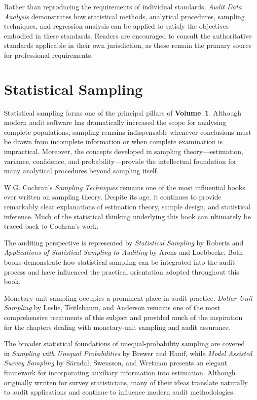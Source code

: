 Rather than reproducing the requirements of individual standards, \textit{Audit Data Analysis} demonstrates how statistical methods, analytical procedures, sampling techniques, and regression analysis can be applied to satisfy the objectives embodied in these standards. Readers are encouraged to consult the authoritative standards applicable in their own jurisdiction, as these remain the primary source for professional requirements.

\section*{Statistical Sampling}

Statistical sampling forms one of the principal pillars of \textbf{Volume~1}. Although modern audit software has dramatically increased the scope for analysing complete populations, sampling remains indispensable whenever conclusions must be drawn from incomplete information or when complete examination is impractical. Moreover, the concepts developed in sampling theory---estimation, variance, confidence, and probability---provide the intellectual foundation for many analytical procedures beyond sampling itself.

W.G. Cochran's \textit{Sampling Techniques} remains one of the most influential books ever written on sampling theory. Despite its age, it continues to provide remarkably clear explanations of estimation theory, sample design, and statistical inference. Much of the statistical thinking underlying this book can ultimately be traced back to Cochran's work.

The auditing perspective is represented by \textit{Statistical Sampling} by Roberts and \textit{Applications of Statistical Sampling to Auditing} by Arens and Loebbecke. Both books demonstrate how statistical sampling can be integrated into the audit process and have influenced the practical orientation adopted throughout this book.

Monetary-unit sampling occupies a prominent place in audit practice. \textit{Dollar Unit Sampling} by Leslie, Teitlebaum, and Anderson remains one of the most comprehensive treatments of this subject and provided much of the inspiration for the chapters dealing with monetary-unit sampling and audit assurance.

The broader statistical foundations of unequal-probability sampling are covered in \textit{Sampling with Unequal Probabilities} by Brewer and Hanif, while \textit{Model Assisted Survey Sampling} by S\"arndal, Swensson, and Wretman presents an elegant framework for incorporating auxiliary information into estimation. Although originally written for survey statisticians, many of their ideas translate naturally to audit applications and continue to influence modern audit methodologies.

